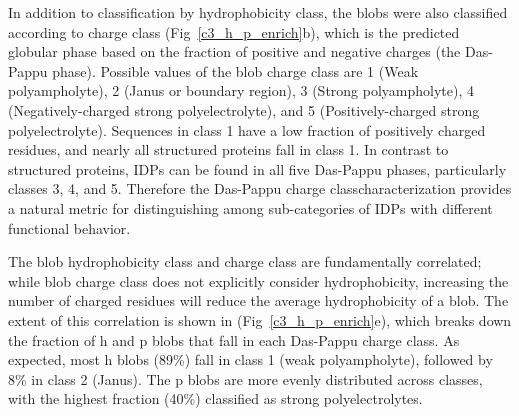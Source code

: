 \documentclass[10pt,letterpaper]{article}
\newcommand{\hydrochar}{hydrophobicity class}
\newcommand{\chargechar}{charge class}
\newcommand{\grace}[1]{\textcolor{red}{#1}}
\begin{document}
In addition to classification by \hydrochar{}, the blobs were also classified according to \chargechar{} (Fig~\ref{c3_h_p_enrich}b), which is the predicted globular phase based on the fraction of positive and negative charges (the Das-Pappu\cite{needed} phase).  
Possible values of the blob \chargechar{} are 1 (Weak polyampholyte), 2 (Janus or boundary region), 3 (Strong polyampholyte), 4 (Negatively-charged strong polyelectrolyte), and 5 (Positively-charged strong polyelectrolyte). Sequences in class 1 have a low fraction of positively charged residues, and nearly all structured proteins fall in class 1. In contrast to structured proteins, IDPs can be found in all five Das-Pappu phases, particularly classes 3, 4, and 5. Therefore the Das-Pappu \chargechar characterization provides a natural metric for distinguishing among sub-categories of IDPs with different functional behavior. 


The blob \hydrochar{} and \chargechar{} are fundamentally correlated; while blob \chargechar{} does not explicitly consider hydrophobicity, increasing the number of charged residues will reduce the average hydrophobicity of a blob. The extent of this correlation is shown in  (Fig~\ref{c3_h_p_enrich}e), which breaks down the fraction of h and p blobs that fall in each Das-Pappu \chargechar. As expected, most h blobs (89\%) fall in class 1 (weak polyampholyte), followed by 8\% in class 2 (Janus).  The p blobs are more evenly distributed across classes, with the highest fraction (40\%) classified as strong polyelectrolytes.  
\end{document}
